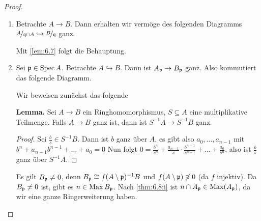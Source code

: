 \documentclass[12pt,a4paper]{scrartcl}
\theoremstyle{cplain}
\theoremstyle{cdef}
\begin{document}
\begin{proof}
	\leavevmode
	\begin{enumerate}[label=\ref{thm:6.8:\roman*}]
		\item Betrachte $A\to B$. Dann erhalten wir vermöge des folgenden Diagramms $\nicefrac{A}{\mathfrak{q}\cap A}\hookrightarrow \nicefrac{B}{\mathfrak{q}}$ ganz.
		\begin{center}
		\end{center}
		Mit \cref{lem:6.7} folgt die Behauptung.
		\item Sei $\mathfrak{p}\in\operatorname{Spec} A$. Betrachte $A\hookrightarrow B$. Dann ist $A_{\mathfrak{p}}\to B_{\mathfrak{p}}$ ganz. Also kommutiert das folgende Diagramm.
		\begin{center}
			\end{center}

		Wir beweisen zunächst das folgende
		
		\textbf{Lemma.} Sei $A\to B$ ein Ringhomomorphismus, $S\subseteq A$ eine multiplikative Teilmenge. Falls $A\to B$ ganz ist, dann ist $S^{-1}A\to S^{-1}B$ ganz.
		\begin{proof}
			Sei $\frac{b}{s}\in S^{-1}B$. Dann ist $b$ ganz über $A$, es gibt also $a_0,\dots, a_{n-1}$ mit $b^n + a_{n-1}b^{n-1}+\dots + a_0 = 0$ Nun folgt $0 = \frac{b^n}{s^n}+\frac{a_{n-1}}{s}\cdot \frac{b^{n-1}}{s^{n-1}}+\dots+\frac {a_0}{s^n}$, also ist $\frac bs$ ganz über $S^{-1}A$.
		\end{proof}
		
		Es gilt $B_{\mathfrak{p}} \neq 0$, denn $B_{\mathfrak{p}}\cong f(A\setminus \mathfrak{p})^{-1}B$ und $f(A\setminus \mathfrak{p})\not \ni 0$ (da $f$ injektiv). Da $B_{\mathfrak{p}}\neq 0$ ist, gibt es $n\in \operatorname{Max} B_{\mathfrak{p}}$. Nach \ref{thm:6.8:i} ist $n\cap A_{\mathfrak{p}} \in \operatorname{Max}(A_{\mathfrak{p}})$, da wir eine ganze Ringerweiterung haben.
		

\end{enumerate}
\end{proof}
\end{document}
